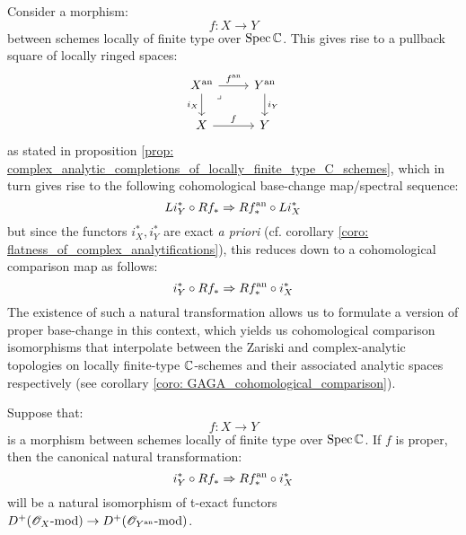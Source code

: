             \begin{remark}
                Consider a morphism:
                    $$f: X \to Y$$
                between schemes locally of finite type over $\operatorname{Spec} \mathbb{C}$. This gives rise to a pullback square of locally ringed spaces:
                    $$
                        \begin{tikzcd}
                    	{X^{\an}} & {Y^{\an}} \\
                    	X & Y
                    	\arrow["{f^{\an}}", from=1-1, to=1-2]
                    	\arrow["f", from=2-1, to=2-2]
                    	\arrow["{i_X}"', from=1-1, to=2-1]
                    	\arrow["{i_Y}", from=1-2, to=2-2]
                    	\arrow["\lrcorner"{anchor=center, pos=0.125}, draw=none, from=1-1, to=2-2]
                        \end{tikzcd}
                    $$
                as stated in proposition \ref{prop: complex_analytic_completions_of_locally_finite_type_C_schemes}, which in turn gives rise to the following cohomological base-change map/spectral sequence:
                    $$Li_Y^* \circ R f_* \Rightarrow R f^{\mathrm{an}}_* \circ Li_X^*$$
                but since the functors $i_X^*, i_Y^*$ are exact \textit{a priori} (cf. corollary \ref{coro: flatness_of_complex_analytifications}), this reduces down to a cohomological comparison map as follows:
                    $$i_Y^* \circ R f_* \Rightarrow R f^{\mathrm{an}}_* \circ i_X^*$$
                The existence of such a natural transformation allows us to formulate a version of proper base-change in this context, which yields us cohomological comparison isomorphisms that interpolate between the Zariski and complex-analytic topologies on locally finite-type $\mathbb{C}$-schemes and their associated analytic spaces respectively (see corollary \ref{coro: GAGA_cohomological_comparison}). 
            \end{remark}
            \begin{theorem} \label{theorem: relative_analytification_of_sheaves_of_modules}
                Suppose that:
                    $$f: X \to Y$$
                is a morphism between schemes locally of finite type over $\operatorname{Spec} \mathbb{C}$. If $f$ is proper, then the canonical natural transformation:
                    $$i_Y^* \circ R f_* \Rightarrow R f^{\mathrm{an}}_* \circ i_X^*$$
                will be a natural isomorphism of t-exact functors $D^+(\mathscr{O}_X\text{-}\mathrm{mod}) \to D^+(\mathscr{O}_{Y^{\mathrm{an}}}\text{-}\mathrm{mod})$.
            \end{theorem}
